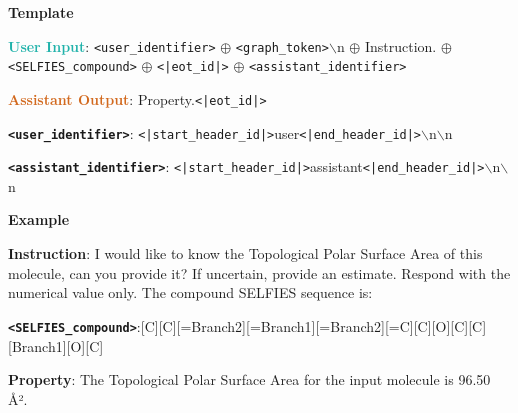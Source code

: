\begin{tcolorbox}[colback=white!98!black,colframe=white!30!black,boxsep=1.1pt,top=6.75pt]%
\vspace{1.75pt}%
\scriptsize
\noindent\makebox[\textwidth]{\rule{\textwidth}{1pt}}
\textbf{Template}
\\[-0.575em]
\noindent\makebox[\textwidth]{\rule{\textwidth}{1pt}}

\textbf{\textcolor[HTML]{20B2AA}{User Input}}: {\tt <user\_identifier>} $\oplus$ {\tt <graph\_token>}$\backslash$n $\oplus$ Instruction. $\oplus$ {\tt <SELFIES\_compound>} $\oplus$ {\tt <|eot\_id|>} $\oplus$ {\tt <assistant\_identifier>}

\textbf{\textcolor[HTML]{D2691E}{Assistant Output}}: Property.{\tt <|eot\_id|>}

{\tt \textbf{<user\_identifier>}}: {\tt <|start\_header\_id|>}user{\tt <|end\_header\_id|>}$\backslash$n$\backslash$n

{\tt \textbf{<assistant\_identifier>}}: {\tt <|start\_header\_id|>}assistant{\tt <|end\_header\_id|>}$\backslash$n$\backslash$n

\noindent\makebox[\textwidth]{\rule{\textwidth}{1pt}}
\textbf{Example}
\\[-0.575em]
\noindent\makebox[\textwidth]{\rule{\textwidth}{1pt}}

\begin{tcolorbox}[colback=cyan!7!white,colframe=white!98!black,boxsep=1.1pt,top=6.75pt]
\textbf{Instruction}: I would like to know the Topological Polar Surface Area of this molecule, can you provide it? If uncertain, provide an estimate. Respond with the numerical value only. The compound SELFIES sequence is:

{\tt \textbf{<SELFIES\_compound>}}:[C][C][=Branch2][=Branch1][=Branch2][=C][C][O][C][C][Branch1][O][C]\-[Branch1][Ring2][O][Ring1][=Branch1] [Branch1][C][C][C][O][C][C][C][C][Branch2][Ring2][\#C][C][Branch2]\-[Ring2][\#Branch2][C][Branch2][Ring1][=Branch1][C][C][Branch1][P][C][Ring1] [=Branch1][Branch1][O][C]\-[Ring1][\#Branch2][C][Ring2][Ring1][C][O][Ring1][Ring1][O][O][C][C][=C][Ring1][=N][N][C][=C][C][=C]\-[C][=C][Ring1][=Branch2][Ring1][=Branch1][C][C][C]

\end{tcolorbox}

\begin{tcolorbox}[colback=orange!7!white,colframe=white!98!black,boxsep=1.1pt,top=6.75pt]
\textbf{Property}: The Topological Polar Surface Area for the input molecule is 96.50 Å².
\end{tcolorbox}

\end{tcolorbox}

